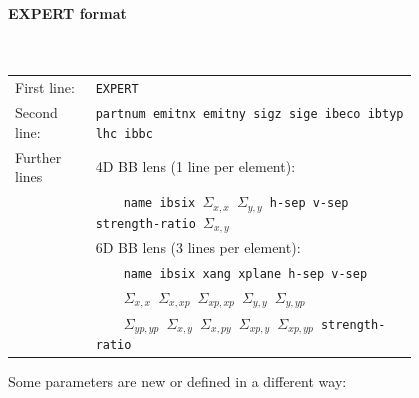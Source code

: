 \paragraph{EXPERT format}~\\

\bigskip
\begin{longtabu}{@{}lp{0.8\linewidth}}
    First line:   & \texttt{EXPERT} \\
    Second line:  & \texttt{partnum emitnx emitny sigz sige ibeco ibtyp lhc ibbc} \\
    Further lines & 4D BB lens (1 line per element): \\
                  & ~~~~\texttt{name ibsix $\Sigma_{x,x}$ $\Sigma_{y,y}$ h-sep v-sep strength-ratio $\Sigma_{x,y}$} \\
                  & 6D BB lens (3 lines per element): \\
                  & ~~~~\texttt{name ibsix xang xplane h-sep v-sep} \\
                  & ~~~~\texttt{$\Sigma_{x,x}$ $\Sigma_{x,xp}$ $\Sigma_{xp,xp}$ $\Sigma_{y,y}$ $\Sigma_{y,yp}$} \\
                  & ~~~~\texttt{$\Sigma_{yp,yp}$ $\Sigma_{x,y}$ $\Sigma_{x,py}$ $\Sigma_{xp,y}$ $\Sigma_{xp,yp}$ strength-ratio}
\end{longtabu}

\bigskip
Some parameters are new or defined in a different way:

